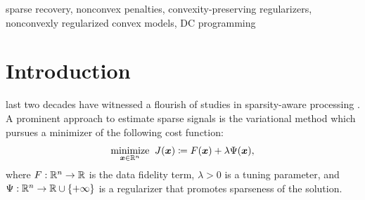 \documentclass[lettersize,journal]{IEEEtran}
\theoremstyle{plain}%
\theoremstyle{definition}
\theoremstyle{remark}
\begin{document}
\begin{abstract}
Recently, several nonconvex sparse regularizers which can preserve the convexity of the cost function have received increasing attention. This paper proposes a general class of such convexity-preserving (CP) regularizers, termed partially smoothed difference-of-convex (pSDC) regularizer. The pSDC regularizer is formulated as a structured difference-of-convex (DC) function, where the landscape of the subtrahend function can be adjusted by a parameterized smoothing function so as to attain overall-convexity. Assigned with proper building blocks, the pSDC regularizer reproduces existing CP regularizers and opens the way to a large number of promising new ones. 

With respect to the resultant nonconvexly regularized convex (NRC) model, we derive a series of overall-convexity conditions which naturally embrace the conditions in previous works. Moreover, we develop a unified framework based on DC programming for solving the NRC model. Compared to previously reported proximal splitting type approaches, the proposed framework makes less stringent assumptions. We establish the convergence of the proposed framework to a global minimizer. Numerical experiments demonstrate the power of the pSDC regularizers and the efficiency of the proposed DC algorithm.
\end{abstract}

\begin{IEEEkeywords}
sparse recovery, nonconvex penalties, convexity-preserving regularizers, nonconvexly regularized convex models, DC programming
\end{IEEEkeywords}


\section{Introduction}
 last two decades have witnessed a flourish of studies in sparsity-aware processing \cite{candes2006,donoho2006,bach2012,eldar2012}. A prominent approach to estimate sparse signals is the variational method which pursues a minimizer of the following cost function: 
\begin{equation}\label{eq:sparse_recovery}
\underset{\bm{x}\in\mathbb{R}^n}{\text{minimize}}\;\;J(\bm{x})\coloneqq F(\bm{x})+\lambda \Psi(\bm{x}),
\end{equation}
where $F:\mathbb{R}^n\to\mathbb{R}$ is the data fidelity term, $\lambda>0$ is a tuning parameter, and $\Psi:\mathbb{R}^n\to\mathbb{R}\cup\{+\infty\}$ is a regularizer that promotes sparseness of the solution.
\end{document}
